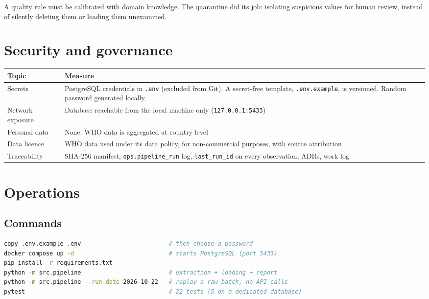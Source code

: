 \documentclass[11pt, a4paper, oneside, headings=normal, numbers=noenddot, DIV=12]{scrartcl}
\begin{document}
\begin{keybox}[Lesson]
A quality rule must be calibrated with domain knowledge. The quarantine did its job: isolating suspicious values for human review, instead of
silently deleting them or loading them unexamined.
\end{keybox}

\section{Security and governance}

\begin{tabularx}{\linewidth}{@{}L{3.6cm} Y@{}}
\toprule
\textbf{Topic} & \textbf{Measure} \\
\midrule
Secrets & PostgreSQL credentials in \texttt{.env} (excluded from Git). A secret-free template, \texttt{.env.example}, is versioned. Random password generated locally. \\
Network exposure & Database reachable from the local machine only (\texttt{127.0.0.1:5433}) \\
Personal data & None: WHO data is aggregated at country level \\
Data licence & WHO data used under its data policy, for non-commercial purposes, with source attribution \\
Traceability & SHA-256 manifest, \texttt{ops.pipeline\_run} log, \texttt{last\_run\_id} on every observation, ADRs, work log \\
\bottomrule
\end{tabularx}

\section{Operations}

\subsection{Commands}
\begin{lstlisting}[language=bash]
copy .env.example .env                         # then choose a password
docker compose up -d                           # starts PostgreSQL (port 5433)
pip install -r requirements.txt
python -m src.pipeline                         # extraction + loading + report
python -m src.pipeline --run-date 2026-10-22   # replay a raw batch, no API calls
pytest                                         # 22 tests (5 on a dedicated database)
\end{lstlisting}
\end{document}
